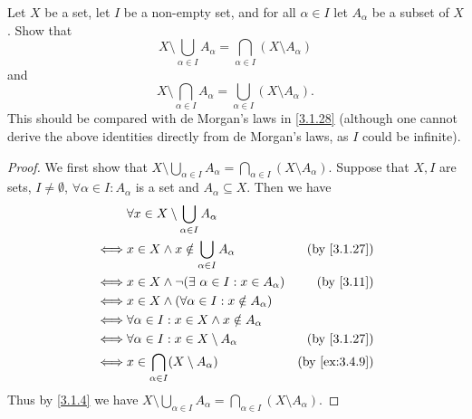 \begin{ex}\label{ex:3.4.11}
  Let \(X\) be a set, let \(I\) be a non-empty set, and for all \(\alpha \in I\) let \(A_{\alpha}\) be a subset of \(X\).
  Show that
  \[
    X \setminus \bigcup_{\alpha \in I} A_{\alpha} = \bigcap_{\alpha \in I} (X \setminus A_{\alpha})
  \]
  and
  \[
    X \setminus \bigcap_{\alpha \in I} A_{\alpha} = \bigcup_{\alpha \in I} (X \setminus A_{\alpha}).
  \]
  This should be compared with de Morgan's laws in \cref{3.1.28}
  (although one cannot derive the above identities directly from de Morgan's laws, as \(I\) could be infinite).
\end{ex}

\begin{proof}
  We first show that \(X \setminus \bigcup_{\alpha \in I} A_{\alpha} = \bigcap_{\alpha \in I} (X \setminus A_{\alpha})\).
  Suppose that \(X, I\) are sets, \(I \neq \emptyset\), \(\forall \alpha \in I : A_{\alpha}\) is a set and \(A_{\alpha} \subseteq X\).
  Then we have
  \begin{align*}
         & \forall x \in X \setminus \bigcup_{\alpha \in I} A_{\alpha}                                 \\
    \iff & x \in X \land x \notin \bigcup_{\alpha \in I} A_{\alpha}      & \text{(by \cref{3.1.27})}   \\
    \iff & x \in X \land \lnot(\exists\ \alpha \in I : x \in A_{\alpha}) & \text{(by \cref{3.11})}     \\
    \iff & x \in X \land (\forall \alpha \in I : x \notin A_{\alpha})                                  \\
    \iff & \forall \alpha \in I : x \in X \land x \notin A_{\alpha}                                    \\
    \iff & \forall \alpha \in I : x \in X \setminus A_{\alpha}           & \text{(by \cref{3.1.27})}   \\
    \iff & x \in \bigcap_{\alpha \in I} (X \setminus A_{\alpha})         & \text{(by \cref{ex:3.4.9})} \\
  \end{align*}
  Thus by \cref{3.1.4} we have \(X \setminus \bigcup_{\alpha \in I} A_{\alpha} = \bigcap_{\alpha \in I} (X \setminus A_{\alpha})\).


\end{proof}
